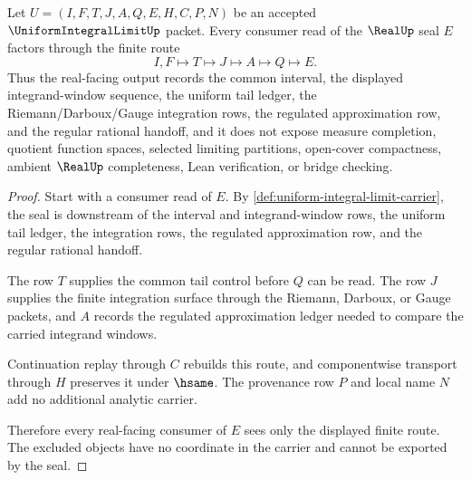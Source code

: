 \begin{theorem}
\label{thm:uniform-integral-limit-real-seal-handoff}
Let $U=(I,F,T,J,A,Q,E,H,C,P,N)$ be an accepted $\UniformIntegralLimitUp$ packet. Every consumer read of the $\RealUp$ seal $E$ factors through the finite route
$$
I,F \longmapsto T \longmapsto J \longmapsto A \longmapsto Q \longmapsto E .
$$
Thus the real-facing output records the common interval, the displayed integrand-window sequence, the uniform tail ledger, the Riemann/Darboux/Gauge integration rows, the regulated approximation row, and the regular rational handoff, and it does not expose measure completion, quotient function spaces, selected limiting partitions, open-cover compactness, ambient $\RealUp$ completeness, Lean verification, or bridge checking.
\end{theorem}
\begin{proof}
Start with a consumer read of $E$. By \autoref{def:uniform-integral-limit-carrier}, the seal is downstream of the interval and integrand-window rows, the uniform tail ledger, the integration rows, the regulated approximation row, and the regular rational handoff.

The row $T$ supplies the common tail control before $Q$ can be read. The row $J$ supplies the finite integration surface through the Riemann, Darboux, or Gauge packets, and $A$ records the regulated approximation ledger needed to compare the carried integrand windows.

Continuation replay through $C$ rebuilds this route, and componentwise transport through $H$ preserves it under $\hsame$. The provenance row $P$ and local name $N$ add no additional analytic carrier.

Therefore every real-facing consumer of $E$ sees only the displayed finite route. The excluded objects have no coordinate in the carrier and cannot be exported by the seal.
\end{proof}


